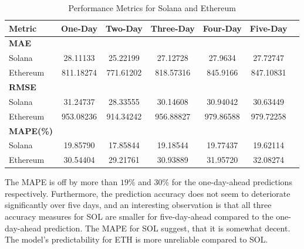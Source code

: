 \begin{table}[H]
\centering
\begin{tabular}{lcccccc}
\toprule
\textbf{Metric} & \textbf{One-Day} & \textbf{Two-Day} & \textbf{Three-Day} & \textbf{Four-Day} & \textbf{Five-Day} \\
\midrule
\textbf{MAE} & & & & & \\
Solana        & 28.11133 & 25.22199 & 27.12728 & 27.9634 & 27.72747 \\
Ethereum      & 811.18274 & 771.61202 & 818.57316 & 845.9166 & 847.10831 \\
\midrule
\textbf{RMSE} & & & & & \\
Solana        & 31.24737 & 28.33555 & 30.14608 & 30.94042 & 30.63449 \\
Ethereum      & 953.08236 & 914.34242 & 956.88827 & 979.86588 & 979.72258 \\
\midrule
\textbf{MAPE(\%)} & & & & & \\
Solana        & 19.85790 & 17.85844 & 19.18544 & 19.77437 & 19.62114 \\
Ethereum      & 30.54404 & 29.21761 & 30.93889 & 31.95720 & 32.08274 \\
\bottomrule
\end{tabular}
\caption{Performance Metrics for Solana and Ethereum}
\label{table:SOL_ETH_MAE_RMSE_MAPE}
\end{table}

\noindent  
The MAPE is off by more than $19\%$ and $30\%$ for the one-day-ahead predictions respectively. Furthermore, the prediction accuracy does not seem to deteriorate significantly over five days, and an interesting observation is that all three accuracy measures for SOL are smaller for five-day-ahead compared to the one-day-ahead prediction. The MAPE for SOL suggest, that it is somewhat decent. The model's predictability for ETH is more unreliable compared to SOL.
\pause

